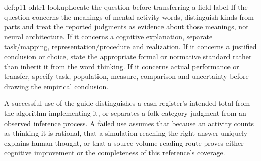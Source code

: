 \begin{hbmethod}{def:p11-ohtr1-lookup}{Locate the question before transferring a field label}
If the question concerns the meanings of mental-activity words, distinguish
kinds from parts and treat the reported judgments as evidence about those
meanings, not neural architecture. If it concerns a cognitive explanation,
separate task/mapping, representation/procedure and realization. If it
concerns a justified conclusion or choice, state the appropriate formal or
normative standard rather than inherit it from the word thinking. If it
concerns actual performance or transfer, specify task, population, measure,
comparison and uncertainty before drawing the empirical conclusion.
\end{hbmethod}

A successful use of the guide distinguishes a cash register's intended
total from the algorithm implementing it, or separates a folk category
judgment from an observed inference process. A failed use assumes that
because an activity counts as thinking it is rational, that a simulation
reaching the right answer uniquely explains human thought, or that a
source-volume reading route proves either cognitive improvement or the
completeness of this reference's coverage.
